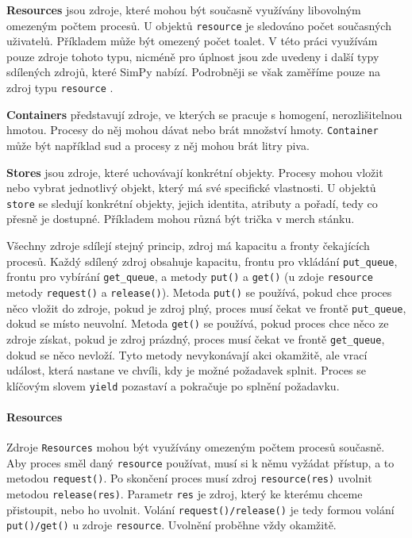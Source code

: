 \documentclass[
  program=itp,
  biblatex,
  figures=false,
  glossaries,
  index
]{kidiplom}
\begin{document}
\noindent \textbf{Resources} jsou zdroje, které mohou být současně využívány libovolným omezeným počtem procesů. U objektů \texttt{resource} je sledováno počet současných uživatelů. Příkladem může být omezený počet toalet. V této práci využívám pouze zdroje tohoto typu, nicméně pro úplnost jsou zde uvedeny i další typy sdílených zdrojů, které SimPy nabízí. Podrobněji se však zaměříme pouze na zdroj typu \texttt{resource} .

\noindent \textbf{Containers} představují zdroje, ve kterých se pracuje s homogení, nerozlišitelnou hmotou. Procesy do něj mohou dávat nebo brát množství hmoty. \texttt{Container} může být například sud a procesy z něj mohou brát litry piva. 

\noindent \textbf{Stores} jsou zdroje, které uchovávají konkrétní objekty. Procesy mohou vložit nebo vybrat jednotlivý objekt, který má své specifické vlastnosti. U objektů \texttt{store} se sledují konkrétní objekty, jejich identita, atributy a pořadí, tedy co přesně je dostupné. Příkladem mohou různá být trička v merch stánku.

Všechny zdroje sdílejí stejný princip, zdroj má kapacitu a fronty čekajících procesů. Každý sdílený zdroj obsahuje kapacitu, frontu pro vkládání \texttt{put\_queue}, frontu pro vybírání \texttt{get\_queue}, a metody \texttt{put()} a \texttt{get()} (u zdoje \texttt{resource} metody \texttt{request()} a \texttt{release()}). Metoda \texttt{put()} se používá, pokud chce proces něco vložit do zdroje, pokud je zdroj plný, proces musí čekat ve frontě \texttt{put\_queue}, dokud se místo neuvolní. Metoda \texttt{get()} se používá, pokud proces chce něco ze zdroje získat, pokud je zdroj prázdný, proces musí čekat ve frontě \texttt{get\_queue}, dokud se něco nevloží. Tyto metody nevykonávají akci okamžitě, ale vrací událost, která nastane ve chvíli, kdy je možné požadavek splnit. Proces se klíčovým slovem \texttt{yield} pozastaví a pokračuje po splnění požadavku.

\paragraph{Resources}
Zdroje \texttt{Resources} mohou být využívány omezeným počtem procesů současně. Aby proces směl daný \texttt{resource} používat, musí si k němu vyžádat přístup, a to metodou \texttt{request()}. Po skončení proces musí zdroj \texttt{resource(res)} uvolnit metodou \texttt{release(res)}. Parametr \texttt{res} je zdroj, který ke kterému chceme přistoupit, nebo ho uvolnit. Volání \texttt{request()/release()} je tedy formou volání \texttt{put()/get()} u zdroje \texttt{resource}. Uvolnění proběhne vždy okamžitě. 
\end{document}
